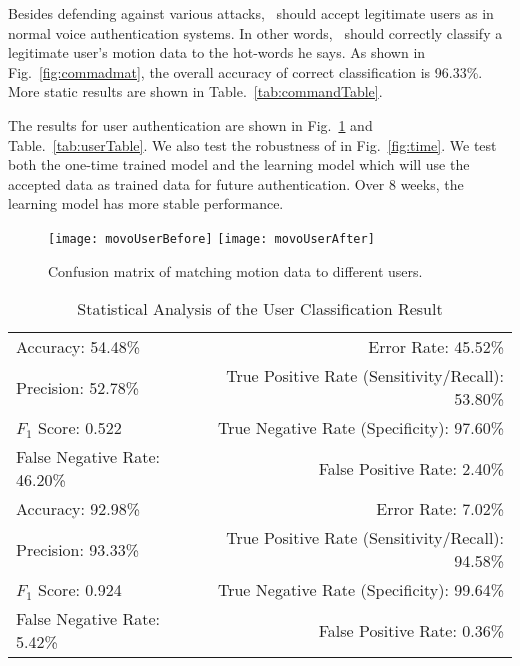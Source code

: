 Besides defending against various attacks, \shortname~should accept legitimate users as in normal voice authentication systems. In other words, \shortname~should correctly classify a legitimate user's motion data to the hot-words he says. As shown in Fig.~\ref{fig:commadmat}, the overall accuracy of correct classification is 96.33\%.  More static results are shown in Table.~\ref{tab:commandTable}.



The results for user authentication are shown in Fig.~\ref{fig:usermat} and Table.~\ref{tab:userTable}. We also test the robustness of {\shortname} in Fig.~\ref{fig:time}. We test both the one-time trained model and the learning model which will use the accepted data as trained data for future authentication. Over 8 weeks, the learning model has more stable performance.
\begin{figure}[h]
	\centering
	\texttt{[image: movoUserBefore]}
	\texttt{[image: movoUserAfter]}
	\caption{Confusion matrix of matching motion data to different users.}
	\label{fig:usermat}
\end{figure}
\begin{table}[t]
	\caption{Statistical Analysis of the User Classification Result}
	\label{tab:userTableBefore}
	\centering
	\begin{tabular}{lr}
		\toprule
		Accuracy: 54.48\% & \hspace{-.55in} Error Rate: 45.52\% \\
		Precision: 52.78\% & \hspace{-.55in} True Positive Rate (Sensitivity/Recall): 53.80\% \\
		$F_1$ Score: 0.522 & \hspace{-.55in} True Negative Rate (Specificity): 97.60\% \\
		False Negative Rate: 46.20\%  & \hspace{-.55in} False Positive Rate: 2.40\% \\
	
		Accuracy: 92.98\% & \hspace{-.55in} Error Rate: 7.02\% \\
		Precision: 93.33\% & \hspace{-.55in} True Positive Rate (Sensitivity/Recall): 94.58\% \\
		$F_1$ Score: 0.924 & \hspace{-.55in} True Negative Rate (Specificity): 99.64\% \\
		False Negative Rate: 5.42\%  & \hspace{-.55in} False Positive Rate: 0.36\% \\
		\bottomrule
	\end{tabular}
\end{table}
